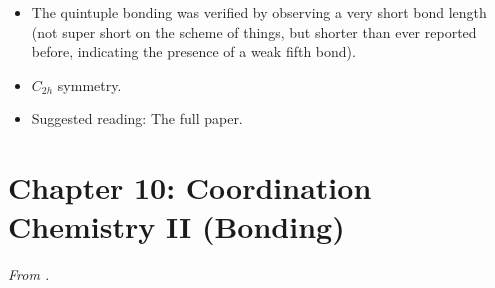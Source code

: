 \documentclass[../notes.tex]{subfiles}
\begin{document}
\begin{itemize}
\begin{itemize}
        \item The quintuple bonding was verified by observing a very short bond length (not super short on the scheme of things, but shorter than ever reported before, indicating the presence of a weak fifth bond).
        \item $C_{2h}$ symmetry.
        \item Suggested reading: The full paper.
    \end{itemize}
\end{itemize}



\section{Chapter 10: Coordination Chemistry II (Bonding)}
\emph{From \textcite{bib:MiesslerFischerTarr}.}
\end{document}
